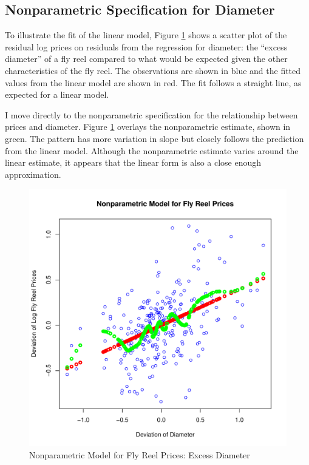 \documentclass[11pt]{paper}
\begin{document}
\clearpage
\subsection{Nonparametric Specification for Diameter}

To illustrate the fit of the linear model, 
Figure \ref{fig:dev_np_vs_diameter_dev} 
shows a scatter plot 
of the residual log prices on 
residuals from the regression for 
diameter:
the ``excess diameter'' of a fly reel 
compared to what would be 
expected given the other characteristics of the fly reel. 
The observations are shown in blue
and the fitted values from the linear model are shown in red.
The fit follows a straight line, as expected for a linear model. 

% 
I move directly to the nonparametric specification for 
the relationship between prices and 
diameter.
Figure \ref{fig:dev_np_vs_diameter_dev} 
overlays the nonparametric estimate, shown in green. 
The pattern has more variation in slope but 
closely follows the prediction from the linear model. 
Although the nonparametric estimate varies around the linear estimate,
it appears that the linear form
is also a close enough approximation.


\begin{figure}[h!]
  \centering
  \includegraphics[scale = 0.5, keepaspectratio=true]{../Figures/dev_np_vs_diameter_dev}
  \caption{Nonparametric Model for Fly Reel Prices: Excess Diameter} \label{fig:dev_np_vs_diameter_dev}
\end{figure}
\end{document}
